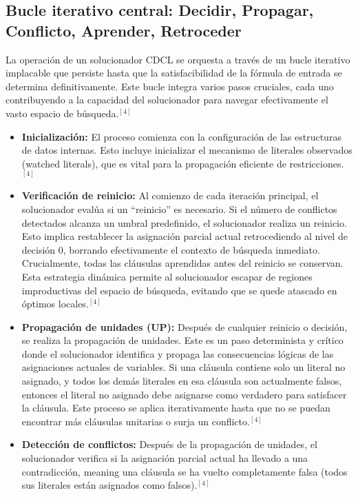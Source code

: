 \documentclass{article}
\begin{document}
\subsection{Bucle iterativo central: Decidir, Propagar, Conflicto, Aprender, Retroceder}

La operación de un solucionador CDCL se orquesta a través de un bucle iterativo implacable que persiste hasta que la satisfacibilidad de la fórmula de entrada se determina definitivamente. Este bucle integra varios pasos cruciales, cada uno contribuyendo a la capacidad del solucionador para navegar efectivamente el vasto espacio de búsqueda.$^{[4]}$

\begin{itemize}
\item \textbf{Inicialización:} El proceso comienza con la configuración de las estructuras de datos internas. Esto incluye inicializar el mecanismo de literales observados (watched literals), que es vital para la propagación eficiente de restricciones.$^{[4]}$

\item \textbf{Verificación de reinicio:} Al comienzo de cada iteración principal, el solucionador evalúa si un ``reinicio'' es necesario. Si el número de conflictos detectados alcanza un umbral predefinido, el solucionador realiza un reinicio. Esto implica restablecer la asignación parcial actual retrocediendo al nivel de decisión 0, borrando efectivamente el contexto de búsqueda inmediato. Crucialmente, todas las cláusulas aprendidas antes del reinicio se conservan. Esta estrategia dinámica permite al solucionador escapar de regiones improductivas del espacio de búsqueda, evitando que se quede atascado en óptimos locales.$^{[4]}$

\item \textbf{Propagación de unidades (UP):} Después de cualquier reinicio o decisión, se realiza la propagación de unidades. Este es un paso determinista y crítico donde el solucionador identifica y propaga las consecuencias lógicas de las asignaciones actuales de variables. Si una cláusula contiene solo un literal no asignado, y todos los demás literales en esa cláusula son actualmente falsos, entonces el literal no asignado debe asignarse como verdadero para satisfacer la cláusula. Este proceso se aplica iterativamente hasta que no se puedan encontrar más cláusulas unitarias o surja un conflicto.$^{[4]}$

\item \textbf{Detección de conflictos:} Después de la propagación de unidades, el solucionador verifica si la asignación parcial actual ha llevado a una contradicción, meaning una cláusula se ha vuelto completamente falsa (todos sus literales están asignados como falsos).$^{[4]}$


\end{itemize}
\end{document}
